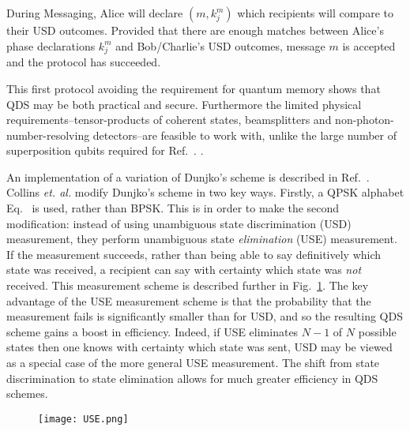 During Messaging, Alice will declare $\left(m, k_j^m\right)$ which recipients will compare to their USD outcomes. Provided that there are enough matches between Alice's phase declarations $k_j^m$ and Bob/Charlie's USD outcomes, message $m$ is accepted and the protocol has succeeded.

This first protocol avoiding the requirement for quantum memory shows that QDS may be both practical and secure. Furthermore the limited physical requirements--tensor-products of coherent states, beamsplitters and non-photon-number-resolving detectors--are feasible to work with, unlike the large number of superposition qubits required for Ref.~\cite{Gottesman2001}. . 

An implementation of a variation of Dunjko's scheme is described in Ref.~\cite{Collins2014}. Collins \emph{et. al.} modify Dunjko's scheme in two key ways. Firstly, a QPSK alphabet Eq.~ is used, rather than BPSK. This is in order to make the second modification: instead of using unambiguous state discrimination (USD) measurement, they perform unambiguous state \emph{elimination} (USE) measurement. If the measurement succeeds, rather than being able to say definitively which state was received, a recipient can say with certainty which state was \emph{not} received. This measurement scheme is described further in Fig.~\ref{fig:USE}. The key advantage of the USE measurement scheme is that the probability that the measurement fails is significantly smaller than for USD, and so the resulting QDS scheme gains a boost in efficiency. Indeed, if USE eliminates $N-1$ of $N$ possible states then one knows with certainty which state was sent, USD may be viewed as a special case of the more general USE measurement. The shift from state discrimination to state elimination allows for much greater efficiency in QDS schemes. 

\begin{figure}[htp]
\centering
\texttt{[image: USE.png]}
\caption{\label{fig:USE}}
\end{figure}

